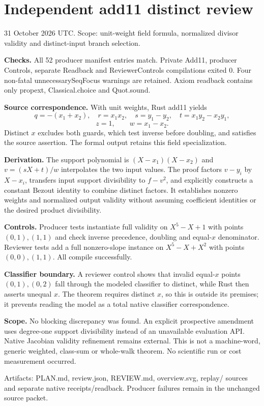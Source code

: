 \documentclass[11pt]{article}
\begin{document}
\section*{Independent add11 distinct review}
31 October 2026 UTC. Scope: unit-weight field formula, normalized divisor validity and distinct-input branch selection.

\textbf{Checks.} All 52 producer manifest entries match. Private Add11, producer Controls, separate Readback and ReviewerControls compilations exited 0. Four non-fatal unnecessarySeqFocus warnings are retained. Axiom readback contains only propext, Classical.choice and Quot.sound.

\textbf{Source correspondence.} With unit weights, Rust add11 yields
\[q=-(x_1+x_2),\quad r=x_1x_2,\quad s=y_1-y_2,\quad t=x_1y_2-x_2y_1,\]
\[z=1,\qquad w=x_1-x_2.\]
Distinct $x$ excludes both guards, which test inverse before doubling, and satisfies the source assertion. The formal output retains this field specialization.

\textbf{Derivation.} The support polynomial is $(X-x_1)(X-x_2)$ and $v=(sX+t)/w$ interpolates the two input values. The proof factors $v-y_i$ by $X-x_i$, transfers input support divisibility to $f-v^2$, and explicitly constructs a constant Bezout identity to combine distinct factors. It establishes nonzero weights and normalized output validity without assuming coefficient identities or the desired product divisibility.

\textbf{Controls.} Producer tests instantiate full validity on $X^5-X+1$ with points $(0,1),(1,1)$ and check inverse precedence, doubling and equal-$x$ denominator. Reviewer tests add a full nonzero-slope instance on $X^5-X+X^2$ with points $(0,0),(1,1)$. All compile successfully.

\textbf{Classifier boundary.} A reviewer control shows that invalid equal-$x$ points $(0,1),(0,2)$ fall through the modeled classifier to distinct, while Rust then asserts unequal $x$. The theorem requires distinct $x$, so this is outside its premises; it prevents reading the model as a total native classifier correspondence.

\textbf{Scope.} No blocking discrepancy was found. An explicit prospective amendment uses degree-one support divisibility instead of an unavailable evaluation API. Native Jacobian validity refinement remains external. This is not a machine-word, generic weighted, class-sum or whole-walk theorem. No scientific run or cost measurement occurred.

Artifacts: PLAN.md, review.json, REVIEW.md, overview.svg, replay/ sources and separate native receipts/readback. Producer failures remain in the unchanged source packet.
\end{document}
